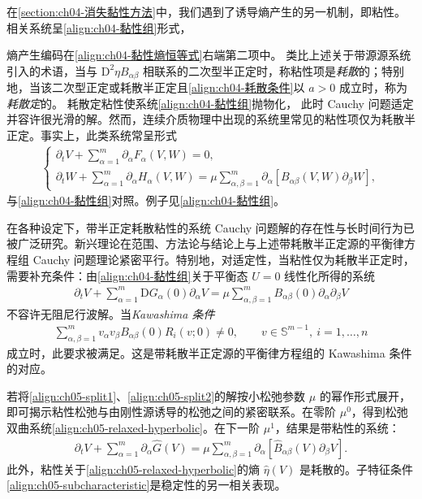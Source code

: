 \documentclass[../../main.tex]{subfiles}
\begin{document}
在\cref{section:ch04-消失黏性方法}中，我们遇到了诱导熵产生的另一机制，即粘性。相关系统呈\eqref{align:ch04-黏性组}形式，

熵产生编码在\eqref{align:ch04-黏性熵恒等式}右端第二项中。
类比上述关于带源源系统引入的术语，当与 $\mathrm{D}^{2}\eta B_{\alpha\beta}$ 相联系的二次型半正定时，称粘性项是\emph{耗散}的；特别地，当该二次型正定或耗散半正定且\eqref{align:ch04-耗散条件}以 $a>0$ 成立时，称为\emph{耗散定}的。
耗散定粘性使系统\eqref{align:ch04-黏性组}抛物化，
此时 Cauchy 问题适定并容许很光滑的解。然而，连续介质物理中出现的系统里常见的粘性项仅为耗散半正定。事实上，此类系统常呈形式
\begin{align}
\begin{cases}
\partial_{t}V+\sum_{\alpha=1}^{m}\partial_{\alpha}F_{\alpha}(V,W)=0,\\
\partial_{t}W+\sum_{\alpha=1}^{m}\partial_{\alpha}H_{\alpha}(V,W)=\mu\sum_{\alpha,\beta=1}^{m}\partial_{\alpha}[B_{\alpha\beta}(V,W)\partial_{\beta}W],
\end{cases}\label{align:ch05-viscous-system}
\end{align}
与\eqref{align:ch04-黏性组}对照。例子见\eqref{align:ch04-黏性组}。


在各种设定下，带半正定耗散粘性的系统 Cauchy 问题解的存在性与长时间行为已被广泛研究。新兴理论在范围、方法论与结论上与上述带耗散半正定源的平衡律方程组 Cauchy 问题理论紧密平行。特别地，对适定性，当粘性仅为耗散半正定时，需要补充条件：由\eqref{align:ch04-黏性组}关于平衡态 $U=0$ 线性化所得的系统
\begin{align}
\partial_{t}V+\sum_{\alpha=1}^{m}\mathrm{D}G_{\alpha}(0)\partial_{\alpha}V=\mu\sum_{\alpha,\beta=1}^{m}B_{\alpha\beta}(0)\partial_{\alpha}\partial_{\beta}V\label{align:ch05-linearized-viscous}
\end{align}
不容许无阻尼行波解。当\emph{Kawashima 条件}
\begin{align}
\sum_{\alpha,\beta=1}^{m}v_{\alpha}v_{\beta}B_{\alpha\beta}(0)R_{i}(v;0)\neq0,\qquad v\in\mathbb{S}^{m-1},\ i=1,\ldots,n\label{align:ch05-kawashima}
\end{align}
成立时，此要求被满足。这是带耗散半正定源的平衡律方程组的 Kawashima 条件的对应。

若将\eqref{align:ch05-split1}、\eqref{align:ch05-split2}的解按小松弛参数 $\mu$ 的幂作形式展开，即可揭示粘性松弛与由刚性源诱导的松弛之间的紧密联系。在零阶 $\mu^{0}$，得到松弛双曲系统\eqref{align:ch05-relaxed-hyperbolic}。在下一阶 $\mu^{1}$，结果是带粘性的系统：
\begin{align}
\partial_{t}V+\sum_{\alpha=1}^{m}\partial_{\alpha}\hat{G}(V)=\mu\sum_{\alpha,\beta=1}^{m}\partial_{\alpha}[\hat{B}_{\alpha\beta}(V)\partial_{\beta}V].\label{align:ch05-viscous-relaxed}
\end{align}
此外，粘性关于\eqref{align:ch05-relaxed-hyperbolic}的熵 $\hat{\eta}(V)$ 是耗散的。子特征条件\eqref{align:ch05-subcharacteristic}是稳定性的另一相关表现。
\end{document}
